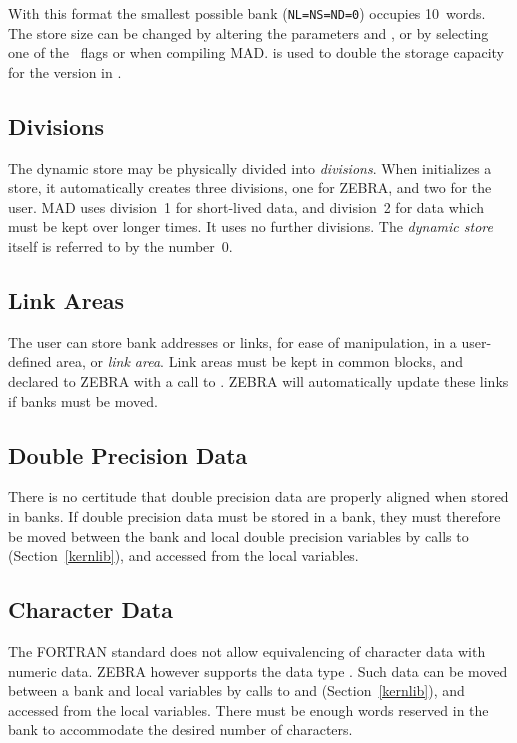 With this format the smallest possible bank ({\tt NL=NS=ND=0})
occupies 10~words.
The store size can be changed by altering
the parameters  and ,
or by selecting one of the \histor\ flags  or
 when compiling MAD.
 is used to double the storage capacity for the version
in .
 
\subsection{Divisions}
The dynamic store may be physically divided into {\em divisions}.
When  initializes a store,
it automatically creates three divisions,
one for ZEBRA, and two for the user.
MAD uses division~1 for short-lived data,
and division~2 for data which must be kept over longer times.
It uses no further divisions.
The {\em dynamic store} itself is referred to by
the number~0.
 
\subsection{Link Areas}
The user can store bank addresses or links, for ease of manipulation,
in a user-defined area, or {\em link area}.
Link areas must be kept in common blocks,
and declared to ZEBRA with a call to .
ZEBRA will automatically update these links if banks must be moved.
 
\subsection{Double Precision Data}
There is no certitude that double precision data are properly aligned
when stored in banks.
If double precision data must be stored in a bank,
they must therefore be moved between the bank and local double
precision variables by calls to  (Section~\ref{kernlib}),
and accessed from the local variables.
 
\subsection{Character Data}
The FORTRAN standard does not allow equivalencing of character
data with numeric data.
ZEBRA however supports the data type .
Such data can be moved between a bank and local 
variables by calls to  and 
(Section~\ref{kernlib}), and accessed from the local variables.
There must be enough words reserved in the bank to accommodate
the desired number of characters.
 

